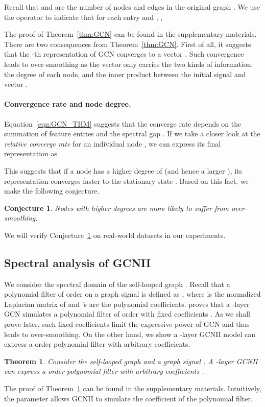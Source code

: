 \documentclass{article}
\newtheorem{theorem}{Theorem}
\newtheorem{conjecture}{Conjecture}
\begin{document}
Recall that  and  are the number of nodes and edges in the
original graph .
We use  the operator  to indicate that  for each entry  and , , 

  The proof of Theorem~\ref{thm:GCN} can be found in the supplementary
materials. 
There are two consequences from Theorem~\ref{thm:GCN}. First of all,
it suggests that the -th representation  of GCN 
converges to a vector  . Such convergence leads to over-smoothing as the vector
  only carries the two kinds of information: the degree of
each node, and  the inner product between the
initial 
signal  and vector . 

\paragraph{Convergence rate and node degree.}
Equation~\eqref{eqn:GCN_THM} suggests that 
the  converge rate depends on the summation of feature entries
 and the spectral gap
. If we take a closer look at the {\em relative converge
rate} for an individual node , we can express its final representation 
as 


 This suggests that if a node  has a higher degree of  (and hence a
 larger ), its representation  converges
 faster to the stationary state . Based on this fact, we make the
 following conjecture.
 \begin{conjecture}
   \label{con:degree}
   Nodes with higher degrees are more likely to suffer from over-smoothing.
 \end{conjecture}
We will verify Conjecture~\ref{con:degree} on real-world datasets
 in our experiments.
 
\subsection{Spectral analysis of GCNII}
We consider the spectral domain of the self-looped graph .
Recall that a polynomial filter of order  on a graph signal
 is defined as , where
 is the normalized Laplacian matrix of
 and 's are the polynomial coefficients. \cite{pmlr-v97-wu19e} proves that a -layer GCN
simulates a polynomial filter of order  with fixed coefficients
. As we shall prove later, such fixed coefficients limit the expressive
power of GCN and thus leads to over-smoothing. On the other hand, 
we show a -layer GCNII model can  express a  order polynomial
 filter with arbitrary coefficients. 
\begin{theorem}
  \label{thm:GCNII}
Consider the self-looped graph  and a graph signal .
  A -layer GCNII can  express a  order polynomial filter  with arbitrary
  coefficients .
  \end{theorem}
The proof of Theorem~\ref{thm:GCNII} can be found in the supplementary
materials. Intuitively, the parameter  allows GCNII to
simulate the coefficient  of the polynomial filter. 
\end{document}
